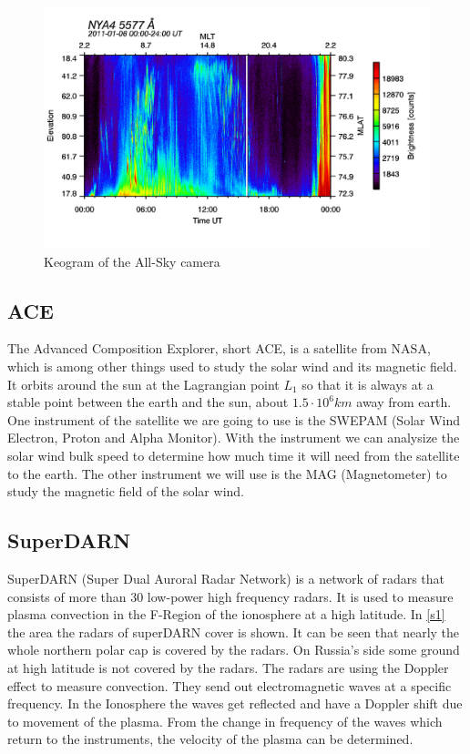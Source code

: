 \documentclass[10pt,a4paper]{article}
\begin{document}
\begin{figure}[h]
	\includegraphics[scale = 0.20]{am-0024-5577.png}
	\centering
	\caption{Keogram of the All-Sky camera}
	\label{a1}
\end{figure}

\subsection{ACE}

The Advanced Composition Explorer, short ACE, is a satellite from NASA, which is among other things used to study the solar wind and its magnetic field. It orbits around the sun at the Lagrangian point $L_1$ so that it is always at a stable point between the earth and the sun, about $1.5 \cdot 10^6 km$ away from earth. 
One instrument of the satellite we are going to use is the SWEPAM (Solar Wind Electron, Proton and Alpha Monitor). With the instrument we can analysize the solar wind bulk speed to determine how much time it will need from the satellite to the earth. 
The other instrument we will use is the MAG (Magnetometer) to study the magnetic field of the solar wind.


\subsection{SuperDARN}

SuperDARN (Super Dual Auroral Radar Network) is a network of radars that consists of more than 30 low-power high frequency radars. It is used to measure plasma convection in the F-Region of the ionosphere at a high latitude. In \ref{s1} the area the radars of superDARN cover is shown. It can be seen that nearly the whole northern polar cap is covered by the radars. On Russia's side some ground at high latitude is not covered by the radars.
The radars are using the Doppler effect to measure convection. They send out electromagnetic waves at a specific frequency. In the Ionosphere the waves get reflected and have a Doppler shift due to movement of the plasma. From the change in frequency of the waves which return to the instruments, the velocity of the plasma can be determined.
\end{document}
